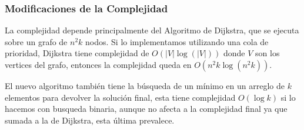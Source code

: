 \subsubsection{Modificaciones de la Complejidad}

La complejidad depende principalmente del Algoritmo de Dijkstra, que se ejecuta sobre un grafo de $n^2k$ nodos. Si lo implementamos utilizando una cola de prioridad, Dijkstra tiene complejidad de $O(|V|\log(|V|))$ donde $V$ son los vertices del grafo, entonces la complejidad queda en $O(n^2k \log(n^2k))$.

El nuevo algoritmo tambi\'en tiene la b\'usqueda de un m\'inimo en un arreglo de $k$ elementos para devolver la soluci\'on final, esta tiene complejidad $O(\log k)$ si lo hacemos con busqueda binaria, aunque no afecta a la complejidad final ya que sumada a la de Dijkstra, esta \'ultima prevalece.




